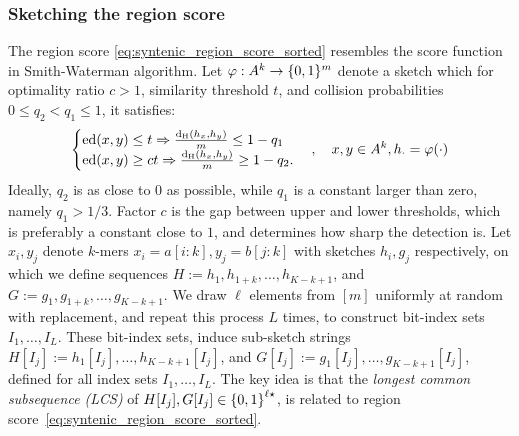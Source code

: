 \subsubsection*{Sketching the region score}
The region score \eqref{eq:syntenic_region_score_sorted} resembles the score function in Smith-Waterman algorithm. Let $\operatorname{\varphi}:A^k\to \{0,1\}^m$ denote a sketch which for optimality ratio $c>1$, similarity threshold $t$, and collision probabilities $0\le q_2<q_1\le 1$, it satisfies:
\begin{equation}
\label{eq:ED_HD_LSH}
\begin{cases}
\operatorname{\mathrm{ed}}(x,y)\le t\Rightarrow \frac{\operatorname{\mathrm{d_{H}}}(h_x,h_y)}{m}\le  1-q_1\\
\operatorname{\mathrm{ed}}(x,y)\ge c t \Rightarrow \frac{\operatorname{\mathrm{d_{H}}}(h_x,h_y)}{m}\ge 1- q_2.
\end{cases}, 
\quad   x,y\in A^k, h_{\cdot}=\operatorname{\varphi}(\cdot)
\end{equation}
Ideally, $q_2$ is as close to $0$ as possible, while $q_1$ is a constant larger than zero, namely $q_1>1/3$. Factor $c$ is the gap between upper and lower thresholds, which is preferably a constant close to $1$, and determines how sharp the detection is.  
Let $x_i,y_j$ denote $k$-mers $x_i=a[i:k], y_j=b[j:k]$ with sketches $h_i,g_j$ respectively, on which we define sequences
$H := h_1,h_{1+k},\dots,h_{K-k+1}$, and $G := g_{1},g_{1+k},\dots,g_{K-k+1}$.
We draw $\ell$ elements from $[m]$ uniformly at random with replacement, and repeat this process $L$ times, to construct bit-index sets $I_1,\dots,I_L$. These bit-index sets, induce sub-sketch strings $H[I_j]:=h_1[I_j],\dots,h_{K-k+1}[I_j]$, and $G[I_j]:=g_1[I_j],\dots,g_{K-k+1}[I_j]$, defined for all index sets $I_1,\dots,I_L$. 
The key idea is that the \emph{longest common subsequence (LCS)} of $H[I_j],G[I_j]\in \left\{0,1\right\}^{\ell\star}$, is related to region score~\eqref{eq:syntenic_region_score_sorted}.


